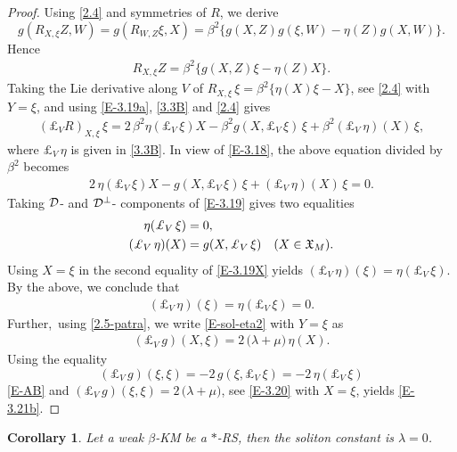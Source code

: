 \documentclass[11pt,a4paper,twoside]{article}
\newtheorem{corollary}{Corollary}%
\begin{document}
{\begin{proof}
Using \eqref{2.4} and symmetries of $R$, we derive
\[
 g(R_{X,\xi}Z, W)=g(R_{W,Z}\xi, X)=\beta^2\{g(X,Z)g(\xi,W)-\eta(Z)g(X,W)\}.
\]
Hence
\begin{align}\label{E-3.19a}
 R_{X,\xi}Z = \beta^2\{g(X,Z)\xi - \eta(Z) X\}.
\end{align}
Taking the Lie derivative along $V$ of $R_{X,\xi}\,\xi= \beta^2\{\eta(X)\xi - X\}$, see \eqref{2.4} with $Y=\xi$,
and using \eqref{E-3.19a}, \eqref{3.3B} and \eqref{2.4} gives
\begin{align*}
 (\pounds_V R)_{X,\xi}\,\xi = 2\,\beta^2\eta(\pounds_V\,\xi)X - \beta^2 g(X,\pounds_V\,\xi)\,\xi + \beta^2(\pounds_V\,\eta)(X)\,\xi ,
\end{align*}
where $\pounds_V\,\eta$ is given in \eqref{3.3B}.
In view of \eqref{E-3.18}, the above equation divided by $\beta^2$ becomes
\begin{align}\label{E-3.19}
 2\,\eta(\pounds_V\,\xi)X - g(X,\pounds_V\,\xi)\,\xi + (\pounds_V\,\eta)(X)\,\xi = 0 .
\end{align}
Taking ${\cal D}$- and ${\cal D}^\bot$- components of \eqref{E-3.19} gives two equalities
\begin{align}\label{E-3.19X}
\notag
 \eta(\pounds_V\,\xi) & = 0 ,\\
 (\pounds_V\,\eta)(X) & = g(X,\pounds_V\,\xi) \quad (X\in\mathfrak{X}_M).
\end{align}
Using $X=\xi$ in the second equality of \eqref{E-3.19X} yields $(\pounds_V\,\eta)(\xi)=\eta(\pounds_V\,\xi)$.
By the above, we conclude that
\begin{align}\label{E-AB}
 (\pounds_V\,\eta)(\xi) = \eta(\pounds_V\,\xi) = 0.
\end{align}
Further,~using \eqref{2.5-patra}, we write \eqref{E-sol-eta2} with $Y=\xi$ as
\begin{align}\label{E-3.20}
 (\pounds_V\,g)(X,\xi) = 2\,\big(\lambda+\mu \big)\,\eta(X).
\end{align}
Using the equality
\[
 (\pounds_V\,g)(\xi,\xi)=-2\,g(\xi, \pounds_V\,\xi)=-2\,\eta(\pounds_V\,\xi)
\]
\eqref{E-AB} and $(\pounds_V\,g)(\xi,\xi) = 2\,\big(\lambda+\mu \big)$, see \eqref{E-3.20} with $X=\xi$, yields \eqref{E-3.21b}.
\end{proof}

\begin{corollary}%
Let a weak $\beta$-KM be a $\ast$-RS, then the soliton constant is $\lambda = 0$.
\end{corollary}

}
\end{document}
